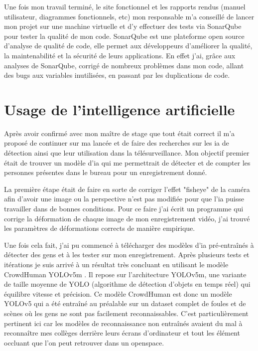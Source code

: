 Une fois mon travail terminé, le site fonctionnel et les rapports rendus (manuel utilisateur, diagrammes fonctionnels, etc) mon responsable m'a conseillé de lancer mon projet sur une machine virtuelle et d'y effectuer des tests via SonarQube \cite{sonarqube} pour tester la qualité de mon code. SonarQube est une plateforme open source d'analyse de qualité de code, elle permet aux développeurs d'améliorer la qualité, la maintenabilité et la sécurité de leurs applications. En effet j'ai, grâce aux analyses de SonarQube, corrigé de nombreux problèmes dans mon code, allant des bugs aux variables inutilisées, en passant par les duplications de code. 

\section{Usage de l'intelligence artificielle}

Après avoir confirmé avec mon maître de stage que tout était correct il m'a proposé de continuer sur ma lancée et de faire des recherches sur les \acrshort{ia} de détection ainsi que leur utilisation dans la télésurveillance. Mon objectif premier était de trouver un modèle d'\acrshort{ia} qui me permettrait de détecter et de compter les personnes présentes dans le bureau pour un enregistrement donné. 

La première étape était de faire en sorte de corriger l'effet "fisheye" de la caméra afin d'avoir une image ou la perspective n'est pas modifiée pour que l'\acrshort{ia} puisse travailler dans de bonnes conditions. Pour ce faire j'ai écrit un programme qui corrige la déformation de chaque image de mon enregistrement vidéo, j'ai trouvé les paramètres de déformations corrects de manière empirique.

Une fois cela fait, j'ai pu commencé à télécharger des modèles d'\acrshort{ia} pré-entraînés à détecter des gens et à les tester sur mon enregistrement. Après plusieurs tests et itérations je suis arrivé à un résultat très concluant en utilisant le modèle CrowdHuman YOLOv5m \cite{yolo,shao2018crowdhuman}. Il repose sur l’architecture YOLOv5m, une variante de taille moyenne de YOLO (algorithme de détection d’objets en temps réel) qui équilibre vitesse et précision. Ce modèle CrowdHuman est donc un modèle YOLOv5 qui a été entraîné au préalable sur un dataset complet de foules et de scènes où les gens ne sont pas facilement reconnaissables. C'est particulièrement pertinent ici car les modèles de reconnaissance non entraînés avaient du mal à reconnaître mes collèges derrière leurs écrans d'ordinateur et tout les élément occluant que l'on peut retrouver dans un openspace. 

